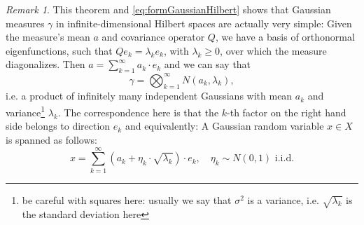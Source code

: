 \documentclass{scrartcl}
\theoremstyle{definition}
\theoremstyle{remark}
\newtheorem{remark}{Remark}
\begin{document}
{\begin{remark}
This theorem and \eqref{eq:formGaussianHilbert} shows that Gaussian measures $\gamma$ in infinite-dimensional Hilbert spaces are actually very simple: Given the measure's mean $a$ and covariance operator $Q$, we have a basis of orthonormal eigenfunctions, such that $Qe_k = \lambda_k e_k$, with $\lambda_k \geq 0$, over which the measure diagonalizes. Then $a = \sum_{k=1}^\infty a_k\cdot e_k$ and we can say that
\begin{displaymath}
\gamma = \bigotimes_{k=1}^\infty N(a_k, \lambda_k),
\end{displaymath}
i.e. a product of infinitely many independent Gaussians with mean $a_k$ and variance\footnote{be careful with squares here: usually we say that $\sigma^2$ is a variance, i.e. $\sqrt{\lambda_k}$ is the standard deviation here} $\lambda_k$. The correspondence here is that the $k$-th factor on the right hand side belongs to direction $e_k$ and equivalently: A Gaussian random variable $x\in X$ is spanned as follows:
\begin{equation}
x = \sum_{k=1}^\infty (a_k + \eta_k\cdot \sqrt{\lambda_k})\cdot e_k,\quad \eta_k \sim N(0,1) \text{ i.i.d.}
\end{equation}
\end{remark}
}
\end{document}
